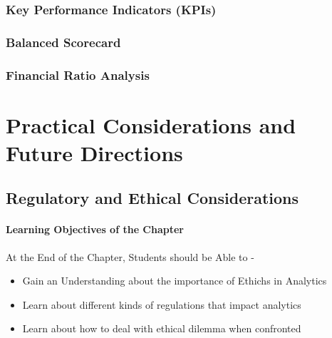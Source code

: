 \documentclass[
  letterpaper,
  DIV=11,
  numbers=noendperiod]{scrreprt}
\begin{document}
\section{Key Performance Indicators
(KPIs)}\label{key-performance-indicators-kpis}

\section{Balanced Scorecard}\label{balanced-scorecard}

\section{Financial Ratio Analysis}\label{financial-ratio-analysis}

\part{Practical Considerations and Future Directions}

\chapter{Regulatory and Ethical
Considerations}\label{regulatory-and-ethical-considerations}

\subsection*{Learning Objectives of the
Chapter}\label{learning-objectives-of-the-chapter-13}

\begin{tcolorbox}[enhanced jigsaw, arc=.35mm, bottomrule=.15mm, bottomtitle=1mm, breakable, colback=white, colbacktitle=quarto-callout-note-color!10!white, colframe=quarto-callout-note-color-frame, coltitle=black, left=2mm, leftrule=.75mm, opacityback=0, opacitybacktitle=0.6, rightrule=.15mm, title=\textcolor{quarto-callout-note-color}{\faInfo}\hspace{0.5em}{Learning Objectives}, titlerule=0mm, toprule=.15mm, toptitle=1mm]

At the End of the Chapter, Students should be Able to -

\begin{itemize}
\item
  Gain an Understanding about the importance of Ethichs in Analytics
\item
  Learn about different kinds of regulations that impact analytics
\item
  Learn about how to deal with ethical dilemma when confronted
\end{itemize}

\end{tcolorbox}
\end{document}
